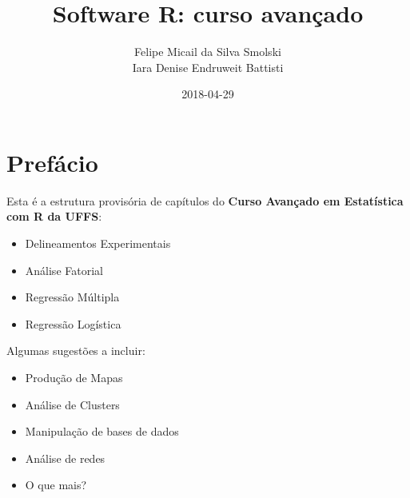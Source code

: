 \documentclass[12pt,brazil,]{book}
\title{Software R: curso avançado}
\author{Felipe Micail da Silva Smolski \\ Iara Denise Endruweit Battisti}
\date{2018-04-29}
\providecommand{\tightlist}{%
  \setlength{\itemsep}{0pt}\setlength{\parskip}{0pt}}
\begin{document}
\maketitle

{
\setcounter{tocdepth}{1}
\tableofcontents
}
\hypertarget{prefacio}{%
\chapter*{Prefácio}\label{prefacio}}

Esta é a estrutura provisória de capítulos do \textbf{Curso Avançado em
Estatística com R da UFFS}:

\begin{itemize}
\tightlist
\item
  Delineamentos Experimentais
\item
  Análise Fatorial
\item
  Regressão Múltipla
\item
  Regressão Logística
\end{itemize}

Algumas sugestões a incluir:

\begin{itemize}
\tightlist
\item
  Produção de Mapas
\item
  Análise de Clusters
\item
  Manipulação de bases de dados
\item
  Análise de redes
\item
  O que mais?
\end{itemize}
\end{document}
